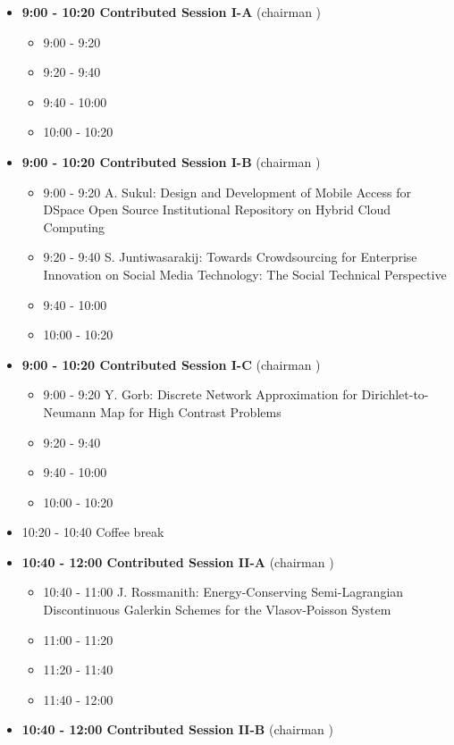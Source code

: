 \documentclass[10pt, A4]{article}%
\begin{document}
\begin{itemize}    
\item {\bf 9:00 - 10:20 Contributed Session I-A} (chairman ) 
  \begin{itemize}
    \item 9:00 - 9:20 
    \item 9:20 - 9:40 
    \item 9:40 - 10:00 
    \item 10:00 - 10:20  
  \end{itemize}
  \item {\bf 9:00 - 10:20 Contributed Session I-B} (chairman ) 
  \begin{itemize}
    \item 9:00 - 9:20 {A. Sukul}: {Design and Development of Mobile Access for DSpace Open Source Institutional Repository on Hybrid Cloud Computing}
    \item 9:20 - 9:40 {S. Juntiwasarakij}: {Towards Crowdsourcing for Enterprise Innovation on Social Media Technology: The Social Technical Perspective}
    \item 9:40 - 10:00 
    \item 10:00 - 10:20      
  \end{itemize}
    \item {\bf 9:00 - 10:20 Contributed Session I-C} (chairman ) 
  \begin{itemize}
    \item 9:00 - 9:20 {Y. Gorb}: {Discrete Network Approximation for Dirichlet-to-Neumann Map for High Contrast Problems}
    \item 9:20 - 9:40 
    \item 9:40 - 10:00 
    \item 10:00 - 10:20      
  \end{itemize}
  \item 10:20 - 10:40 Coffee break
  \item {\bf 10:40 - 12:00 Contributed Session II-A} (chairman ) 
  \begin{itemize}
    \item 10:40 - 11:00 {J. Rossmanith}: {Energy-Conserving Semi-Lagrangian Discontinuous Galerkin Schemes for the Vlasov-Poisson System}
    \item 11:00 - 11:20 
    \item 11:20 - 11:40 
    \item 11:40 - 12:00 
  \end{itemize}
  \item {\bf 10:40 - 12:00 Contributed Session II-B} (chairman ) 

\end{itemize}
\end{document}
